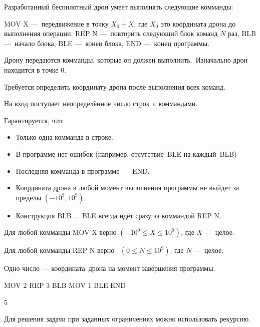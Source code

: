 
Разработанный беспилотный дрон умеет выполнять следующие комманды:

MOV X — передвижение в точку $X_0 + X$, где $X_0$ это координата дрона до выполнения операции,
REP N — повторить следующий блок команд $N$ раз,
BLB — начало блока,
BLE — конец блока,
END — конец программы.

Дрону передаются комманды, которые он должен выполнить. Изначально дрон находится в точке $0$.

Требуется определить координату дрона после выполнения всех команд.


На вход поступает неопределённое число строк с коммандами.

Гарантируется, что:

\begin{itemize}
\item Только одна комманда в строке.
\item В программе нет ошибок (например, отсутствие BLE на каждый BLB)
\item Последняя комманда в программе — END.
\item Координата дрона в любой момент выполнения программы не выйдет за пределы $(-10^9, 10^9)$.
\item Конструкция BLB ... BLE всегда идёт сразу за коммандой REP N.
\end{itemize}

Для любой комманды MOV X верно $(-10^9 \leq X \leq 10^9)$, где $X$ — целое.

Для любой комманды REP N верно  $(0 \leq N \leq 10^9)$, где $N$ — целое.


\outputfmtSection

Одно число — координата дрона на момент завершения программы.


\begin{myverbbox}[\small]{\vinput}
    MOV 2 
    REP 3 
    BLB 
    MOV 1 
    BLE
    END
\end{myverbbox}

\begin{myverbbox}[\small]{\voutput}
    5
\end{myverbbox}

\solutionSection

Для решения задачи при заданных ограничениях можно использовать рекурсию.

